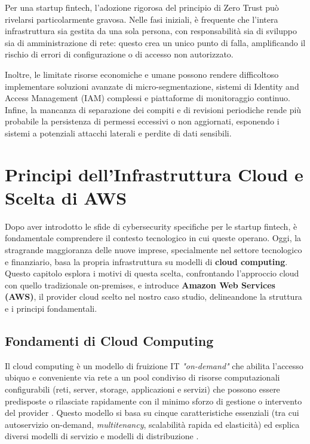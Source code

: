 \documentclass[a4paper,12pt]{report}
\begin{document}
Per una startup fintech, l'adozione rigorosa del principio di Zero Trust può rivelarsi particolarmente gravosa. Nelle fasi iniziali, è frequente che l'intera infrastruttura sia gestita da una sola persona, con responsabilità sia di sviluppo sia di amministrazione di rete: questo crea un unico punto di falla, amplificando il rischio di errori di configurazione o di accesso non autorizzato.

Inoltre, le limitate risorse economiche e umane possono rendere difficoltoso implementare soluzioni avanzate di micro-segmentazione, sistemi di Identity and Access Management (IAM) complessi e piattaforme di monitoraggio continuo. Infine, la mancanza di separazione dei compiti e di revisioni periodiche rende più probabile la persistenza di permessi eccessivi o non aggiornati, esponendo i sistemi a potenziali attacchi laterali e perdite di dati sensibili.
\chapter{Principi dell'Infrastruttura Cloud e Scelta di AWS}
\label{ch:cloud-aws}

Dopo aver introdotto le sfide di cybersecurity specifiche per le startup fintech, è fondamentale comprendere il contesto tecnologico in cui queste operano. Oggi, la stragrande maggioranza delle nuove imprese, specialmente nel settore tecnologico e finanziario, basa la propria infrastruttura su modelli di \textbf{cloud computing}. Questo capitolo esplora i motivi di questa scelta, confrontando l'approccio cloud con quello tradizionale on-premises, e introduce \textbf{Amazon Web Services (AWS)}, il provider cloud scelto nel nostro caso studio, delineandone la struttura e i principi fondamentali.
\section{Fondamenti di Cloud Computing}
Il cloud computing è un modello di fruizione IT \textit{"on-demand"} che abilita l'accesso ubiquo e conveniente via rete a un pool condiviso di risorse computazionali configurabili (reti, server, storage, applicazioni e servizi) che possono essere predisposte o rilasciate rapidamente con il minimo sforzo di gestione o intervento del provider \cite{nist800-145}. Questo modello si basa su cinque caratteristiche essenziali (tra cui autoservizio on-demand, \textit{multitenancy}, scalabilità rapida ed elasticità) ed esplica diversi modelli di servizio e modelli di distribuzione \cite{nist800-145}.
\end{document}
